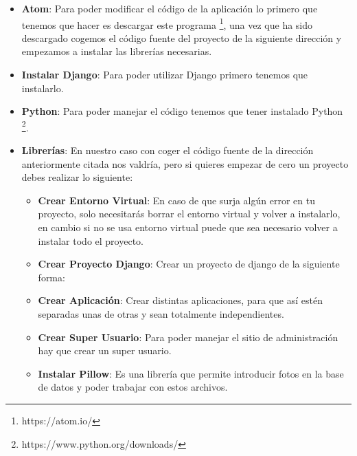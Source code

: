 \begin{itemize}
	\item \textbf{Atom}: Para poder modificar el código de la aplicación lo primero que tenemos que hacer es descargar este programa \footnote{https://atom.io/}, una vez que ha sido descargado cogemos el código fuente del proyecto de la siguiente dirección \cite{Repositorio} y empezamos a instalar las librerías necesarias.
	
	\item \textbf{Instalar Django}: Para poder utilizar Django primero tenemos que instalarlo.
	
	\item \textbf{Python}: Para poder manejar el código tenemos que tener instalado Python \footnote{https://www.python.org/downloads/}.
	
	\item \textbf{Librerías}: En nuestro caso con coger el código fuente de la dirección anteriormente citada nos valdría, pero si quieres empezar de cero un proyecto debes realizar lo siguiente:
	
		\begin{itemize}
			\item \textbf{Crear Entorno Virtual}: En caso de que surja algún error en tu proyecto, solo necesitarás borrar el entorno virtual y volver a instalarlo, en cambio si no se usa entorno virtual puede que sea necesario volver a instalar todo el proyecto.
			
			\item \textbf{Crear Proyecto Django}: Crear un proyecto de django de la siguiente forma: 
			
			\item \textbf{Crear Aplicación}: Crear distintas aplicaciones, para que así estén separadas unas de otras y sean totalmente independientes.
			
			\item \textbf{Crear Super Usuario}: Para poder manejar el sitio de administración hay que crear un super usuario.
			
			\item \textbf{Instalar Pillow}: Es una librería que permite introducir fotos en la base de datos y poder trabajar con estos archivos.
			
		\end{itemize}
\end{itemize}

